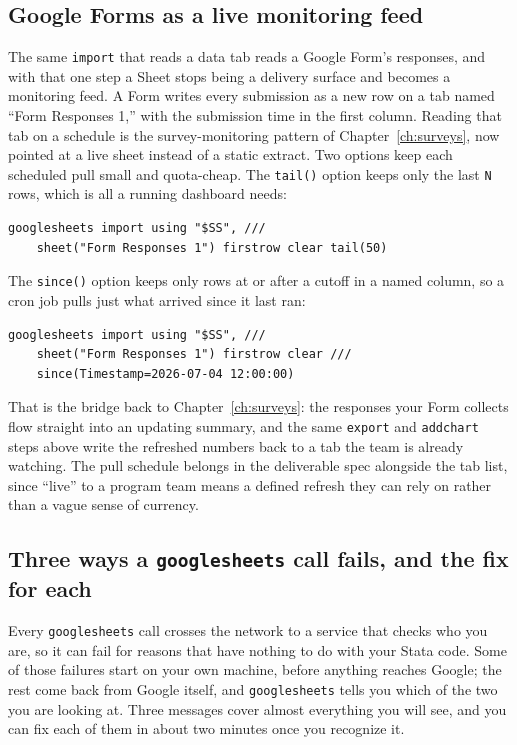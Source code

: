 \documentclass[
    a4paper,
    fontsize=10pt,
    twoside=true,
    numbers=noenddot,
]{kaobook}
\begin{document}
\subsection{Google Forms as a live monitoring feed}
The same \texttt{import} that reads a data tab reads a Google Form's responses, and with that one step a Sheet stops being a delivery surface and becomes a monitoring feed. A Form writes every submission as a new row on a tab named \enquote{Form Responses 1,} with the submission time in the first column. Reading that tab on a schedule is the survey-monitoring pattern of Chapter~\ref{ch:surveys}, now pointed at a live sheet instead of a static extract. Two options keep each scheduled pull small and quota-cheap. The \texttt{tail()} option keeps only the last \texttt{N} rows, which is all a running dashboard needs:
\par
{\footnotesize
\begin{verbatim}
googlesheets import using "$SS", ///
    sheet("Form Responses 1") firstrow clear tail(50)
\end{verbatim}
}
The \texttt{since()} option keeps only rows at or after a cutoff in a named column, so a cron job pulls just what arrived since it last ran:
\par
{\footnotesize
\begin{verbatim}
googlesheets import using "$SS", ///
    sheet("Form Responses 1") firstrow clear ///
    since(Timestamp=2026-07-04 12:00:00)
\end{verbatim}
}
That is the bridge back to Chapter~\ref{ch:surveys}: the responses your Form collects flow straight into an updating summary, and the same \texttt{export} and \texttt{addchart} steps above write the refreshed numbers back to a tab the team is already watching. The pull schedule belongs in the deliverable spec alongside the tab list, since \enquote{live} to a program team means a defined refresh they can rely on rather than a vague sense of currency.

\subsection{Three ways a \texttt{googlesheets} call fails, and the fix for each}\label{sec:ch11-gs-failures}
Every \texttt{googlesheets} call crosses the network to a service that checks who you are, so it can fail for reasons that have nothing to do with your Stata code. Some of those failures start on your own machine, before anything reaches Google; the rest come back from Google itself, and \texttt{googlesheets} tells you which of the two you are looking at. Three messages cover almost everything you will see, and you can fix each of them in about two minutes once you recognize it.
\end{document}
